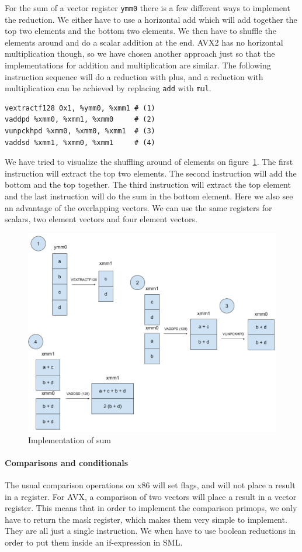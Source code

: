 \documentclass{article}
\begin{document}
For the sum of a vector register \verb!ymm0! there is a few different ways to implement the reduction. We either have to use a horizontal add which will add together the top two elements and the bottom two elements. We then have to shuffle the elements around and do a scalar addition at the end. AVX2 has no horizontal multiplication though, so we have chosen another approach just so that the implementations for addition and multiplication are similar. The following instruction sequence will do a reduction with plus, and a reduction with multiplication can be achieved by replacing \verb!add! with \verb!mul!.
\begin{verbatim}
vextractf128 0x1, %ymm0, %xmm1 # (1)
vaddpd %xmm0, %xmm1, %xmm0     # (2)
vunpckhpd %xmm0, %xmm0, %xmm1  # (3)
vaddsd %xmm1, %xmm0, %xmm1     # (4)
\end{verbatim}
We have tried to visualize the shuffling around of elements on figure~\ref{fig:hadd}. The first instruction will extract the top two elements. The second instruction will add the bottom and the top together. The third instruction will extract the top element and the last instruction will do the sum in the bottom element. Here we also see an advantage of the overlapping vectors. We can use the same registers for scalars, two element vectors and four element vectors.
\begin{figure}
    \caption{Implementation of sum}
    \label{fig:hadd}
    \includegraphics[width=\textwidth]{sum.png}
\end{figure}

\paragraph{Comparisons and conditionals}
The usual comparison operations on x86 will set flags, and will not place a result in a register. For AVX, a comparison of two vectors will place a result in a vector register. This means that in order to implement the comparison primops, we only have to return the mask register, which makes them very simple to implement. They are all just a single instruction. We when have to use boolean reductions in order to put them inside an if-expression in SML.
\end{document}
